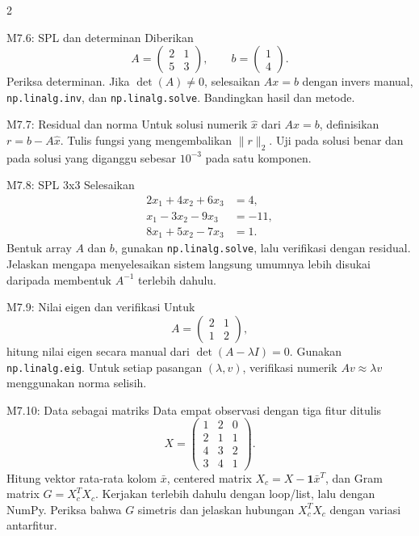 \documentclass[9pt,a4paper]{article}
\begin{document}
\begin{multicols}{2}
\begin{qbox}[L3]{M7.6: SPL dan determinan}
Diberikan
\[
A=\begin{pmatrix}2&1\\5&3\end{pmatrix},\qquad
b=\begin{pmatrix}1\\4\end{pmatrix}.
\]
Periksa determinan. Jika $\det(A)\ne0$, selesaikan $Ax=b$ dengan invers manual, \texttt{np.linalg.inv}, dan \texttt{np.linalg.solve}. Bandingkan hasil dan metode.
\end{qbox}

\begin{qbox}[L3]{M7.7: Residual dan norma}
Untuk solusi numerik $\hat x$ dari $Ax=b$, definisikan $r=b-A\hat x$. Tulis fungsi yang mengembalikan $\|r\|_2$. Uji pada solusi benar dan pada solusi yang diganggu sebesar $10^{-3}$ pada satu komponen.
\end{qbox}

\begin{qbox}[L3]{M7.8: SPL 3x3}
Selesaikan
\[
\begin{aligned}
2x_1+4x_2+6x_3&=4,\\
x_1-3x_2-9x_3&=-11,\\
8x_1+5x_2-7x_3&=1.
\end{aligned}
\]
Bentuk array $A$ dan $b$, gunakan \texttt{np.linalg.solve}, lalu verifikasi dengan residual. Jelaskan mengapa menyelesaikan sistem langsung umumnya lebih disukai daripada membentuk $A^{-1}$ terlebih dahulu.
\end{qbox}

\begin{qbox}[L4]{M7.9: Nilai eigen dan verifikasi}
Untuk
\[
A=\begin{pmatrix}2&1\\1&2\end{pmatrix},
\]
hitung nilai eigen secara manual dari $\det(A-\lambda I)=0$. Gunakan \texttt{np.linalg.eig}. Untuk setiap pasangan $(\lambda,v)$, verifikasi numerik $Av\approx\lambda v$ menggunakan norma selisih.
\end{qbox}

\begin{qbox}[L4]{M7.10: Data sebagai matriks}
Data empat observasi dengan tiga fitur ditulis
\[
X=\begin{pmatrix}
1&2&0\\
2&1&1\\
4&3&2\\
3&4&1
\end{pmatrix}.
\]
Hitung vektor rata-rata kolom $\bar x$, centered matrix $X_c=X-\mathbf{1}\bar x^T$, dan Gram matrix $G=X_c^T X_c$. Kerjakan terlebih dahulu dengan loop/list, lalu dengan NumPy. Periksa bahwa $G$ simetris dan jelaskan hubungan $X_c^T X_c$ dengan variasi antarfitur.
\end{qbox}

\end{multicols}
\end{document}
